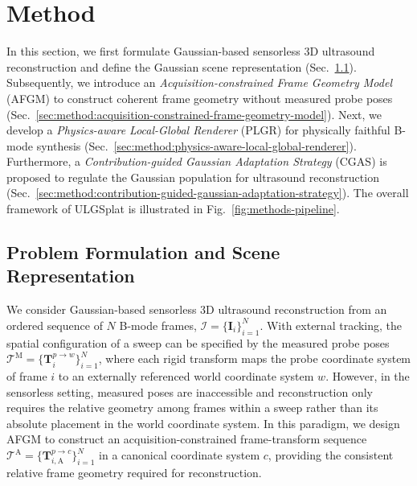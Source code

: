 \vspace{-2mm}
\section{Method}
\label{sec:method}

In this section, we first formulate Gaussian-based sensorless 3D ultrasound
reconstruction and define the Gaussian scene representation
(Sec.~\ref{sec:method:problem-formulation-and-scene-representation}). Subsequently,
we introduce an \emph{Acquisition-constrained Frame Geometry Model} (AFGM) to
construct coherent frame geometry without measured probe poses
(Sec.~\ref{sec:method:acquisition-constrained-frame-geometry-model}).
Next, we develop a \emph{Physics-aware Local-Global Renderer} (PLGR) for
physically faithful B-mode synthesis
(Sec.~\ref{sec:method:physics-aware-local-global-renderer}).
Furthermore, a \emph{Contribution-guided Gaussian Adaptation Strategy} (CGAS)
is proposed to regulate the Gaussian population for ultrasound reconstruction
(Sec.~\ref{sec:method:contribution-guided-gaussian-adaptation-strategy}).
The overall framework of ULGSplat is illustrated in
Fig.~\ref{fig:methods-pipeline}.

\vspace{-3mm}
\subsection{Problem Formulation and Scene Representation}
\label{sec:method:problem-formulation-and-scene-representation}

We consider Gaussian-based sensorless 3D ultrasound reconstruction from an
ordered sequence of $N$ B-mode frames,
$\mathcal I=\{\mathbf I_i\}_{i=1}^{N}$. With external tracking, the spatial
configuration of a sweep can be specified by the measured probe poses
$\mathcal T^{\mathrm M}
=
\{\mathbf T_i^{p\rightarrow w}\}_{i=1}^{N}$,
where each rigid transform maps the probe coordinate system of frame $i$ to an
externally referenced world coordinate system $w$. However, in the sensorless
setting, measured poses are inaccessible and reconstruction only requires the
relative geometry among frames within a sweep rather than its absolute
placement in the world coordinate system. In this paradigm, we design AFGM to
construct an acquisition-constrained frame-transform sequence
$\mathcal T^{\mathrm A}
=
\{\mathbf T_{i,\mathrm A}^{p\rightarrow c}\}_{i=1}^{N}$
in a canonical coordinate system $c$, providing the consistent relative frame
geometry required for reconstruction.


